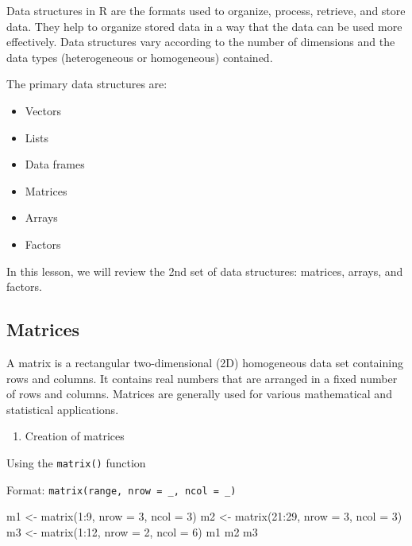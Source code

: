 \documentclass[
  letterpaper,
  DIV=11,
  numbers=noendperiod]{scrreprt}
\newenvironment{Shaded}{}{}
\newcommand{\AttributeTok}[1]{\textcolor[rgb]{0.84,0.23,0.29}{#1}}
\newcommand{\DecValTok}[1]{\textcolor[rgb]{0.00,0.36,0.77}{#1}}
\newcommand{\FunctionTok}[1]{\textcolor[rgb]{0.44,0.26,0.76}{#1}}
\newcommand{\NormalTok}[1]{\textcolor[rgb]{0.14,0.16,0.18}{#1}}
\newcommand{\OtherTok}[1]{\textcolor[rgb]{0.44,0.26,0.76}{#1}}
\newcommand{\SpecialCharTok}[1]{\textcolor[rgb]{0.00,0.36,0.77}{#1}}
\providecommand{\tightlist}{%
  \setlength{\itemsep}{0pt}\setlength{\parskip}{0pt}}\usepackage{longtable,booktabs,array}
\begin{document}
Data structures in R are the formats used to organize, process,
retrieve, and store data. They help to organize stored data in a way
that the data can be used more effectively. Data structures vary
according to the number of dimensions and the data types (heterogeneous
or homogeneous) contained.

The primary data structures are:

\begin{itemize}
\item
  Vectors
\item
  Lists
\item
  Data frames
\item
  Matrices
\item
  Arrays
\item
  Factors
\end{itemize}

In this lesson, we will review the 2nd set of data structures: matrices,
arrays, and factors.

\subsection{Matrices}\label{matrices}

A matrix is a rectangular two-dimensional (2D) homogeneous data set
containing rows and columns. It contains real numbers that are arranged
in a fixed number of rows and columns. Matrices are generally used for
various mathematical and statistical applications.

\begin{enumerate}
\def\labelenumi{\alph{enumi}.}
\tightlist
\item
  Creation of matrices
\end{enumerate}

Using the \texttt{matrix()} function

Format: \texttt{matrix(range,\ nrow\ =\ \_,\ ncol\ =\ \_)}

\begin{Shaded}
\begin{Highlighting}[]
\NormalTok{m1 }\OtherTok{\textless{}{-}} \FunctionTok{matrix}\NormalTok{(}\DecValTok{1}\SpecialCharTok{:}\DecValTok{9}\NormalTok{, }\AttributeTok{nrow =} \DecValTok{3}\NormalTok{, }\AttributeTok{ncol =} \DecValTok{3}\NormalTok{)}
\NormalTok{m2 }\OtherTok{\textless{}{-}} \FunctionTok{matrix}\NormalTok{(}\DecValTok{21}\SpecialCharTok{:}\DecValTok{29}\NormalTok{, }\AttributeTok{nrow =} \DecValTok{3}\NormalTok{, }\AttributeTok{ncol =} \DecValTok{3}\NormalTok{)}
\NormalTok{m3 }\OtherTok{\textless{}{-}} \FunctionTok{matrix}\NormalTok{(}\DecValTok{1}\SpecialCharTok{:}\DecValTok{12}\NormalTok{, }\AttributeTok{nrow =} \DecValTok{2}\NormalTok{, }\AttributeTok{ncol =} \DecValTok{6}\NormalTok{)}
\NormalTok{m1}
\NormalTok{m2}
\NormalTok{m3}
\end{Highlighting}
\end{Shaded}
\end{document}
